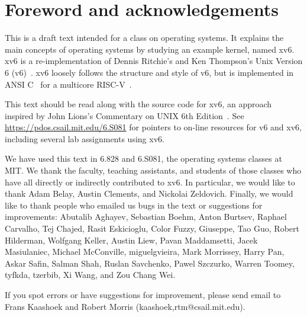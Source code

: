 \chapter*{Foreword and acknowledgements}


This is a draft text intended for a class on operating systems. It
explains the main concepts of operating systems by studying an example
kernel, named xv6.  xv6 is a re-implementation of Dennis Ritchie's and
Ken Thompson's Unix Version 6 (v6)~\cite{unix}.  xv6 loosely follows the structure
and style of v6, but is implemented in ANSI C~\cite{kernighan} for 
a multicore RISC-V~\cite{riscv}.

This text should be read along with the source code for xv6, an approach 
inspired by John Lions's Commentary on UNIX 6th Edition~\cite{lions}. See
\url{https://pdos.csail.mit.edu/6.S081} for pointers to on-line
resources for v6 and xv6, including several lab assignments
using xv6.

We have used this text in 6.828 and 6.S081, the operating systems classes at MIT.
We thank the faculty, teaching assistants, and students of those
classes who
have all directly or indirectly contributed to xv6.  In particular, we
would like to thank Adam Belay, Austin Clements, and Nickolai Zeldovich.  Finally,
we would like to thank people who emailed us bugs in the text or
suggestions for improvements: Abutalib Aghayev, Sebastian Boehm, Anton
Burtsev, Raphael Carvalho, Tej Chajed, Rasit Eskicioglu, Color Fuzzy, Giuseppe,
Tao Guo, Robert Hilderman, Wolfgang Keller, Austin Liew, Pavan
Maddamsetti, Jacek Masiulaniec, Michael McConville, miguelgvieira,
Mark Morrissey, Harry Pan, Askar Safin, Salman Shah, Ruslan Savchenko,
Pawel Szczurko, Warren Toomey, tyfkda, tzerbib, Xi Wang, and Zou Chang Wei.

If you spot errors or have suggestions for improvement, please send email to
Frans Kaashoek and Robert Morris (kaashoek,rtm@csail.mit.edu).
